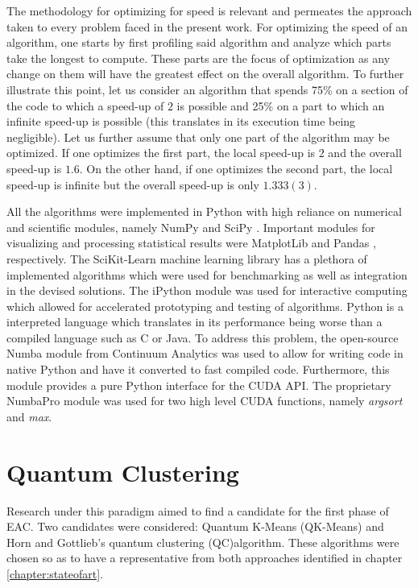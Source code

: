 The methodology for optimizing for speed is relevant and permeates the approach taken to every problem faced in the present work.
For optimizing the speed of an algorithm, one starts by first profiling said algorithm and analyze which parts take the longest to compute.
These parts are the focus of optimization as any change on them will have the greatest effect on the overall algorithm.
To further illustrate this point, let us consider an algorithm that spends 75\% on a section of the code to which a speed-up of $2$ is possible and 25\% on a part to which an infinite speed-up is possible (this translates in its execution time being negligible).
Let us further assume that only one part of the algorithm may be optimized.
If one optimizes the first part, the local speed-up is $2$ and the overall speed-up is $1.6$.
On the other hand, if one optimizes the second part, the local speed-up is infinite but the overall speed-up is only $1.333(3)$.

All the algorithms were implemented in Python with high reliance on numerical and scientific modules, namely NumPy \cite{VanDerWalt2011} and SciPy \cite{JonesSciPy,Oliphant2007,Millman2011}.
Important modules for visualizing and processing statistical results were MatplotLib \cite{hunter2007matplotlib} and Pandas \cite{McKinney2010}, respectively.
The SciKit-Learn \cite{Pedregosa2012} machine learning library has a plethora of implemented algorithms which were used for benchmarking as well as integration in the devised solutions.
The iPython \cite{Perez2007} module was used for interactive computing which allowed for accelerated prototyping and testing of algorithms.
Python is a interpreted language which translates in its performance being worse than a compiled language such as C or Java.
To address this problem, the open-source Numba module from Continuum Analytics was used to allow for writing code in native Python and have it converted to fast compiled code.
Furthermore, this module provides a pure Python interface for the CUDA API.
The proprietary NumbaPro module was used for two high level CUDA functions, namely \emph{argsort} and \emph{max}. %


\section{Quantum Clustering}

Research under this paradigm aimed to find a candidate for the first phase of EAC.
Two candidates were considered: Quantum K-Means (QK-Means) and Horn and Gottlieb's quantum clustering (QC)algorithm.
These algorithms were chosen so as to have a representative from both approaches identified in chapter \ref{chapter:stateofart}.


